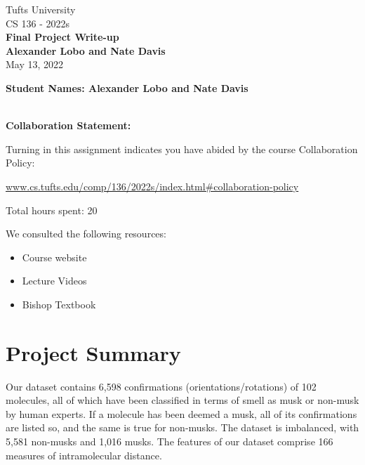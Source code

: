 \documentclass[11pt]{extarticle}
\begin{document}
\begin{titlepage}
\begin{center}
{\Large{Tufts University}}
~~\\[7.7 cm]
{\Huge {CS 136 - 2022s}} \\[0.4 cm]
{\Huge {\bf Final Project Write-up}} \\[7.7 cm]
{\Large {\bf Alexander Lobo and Nate Davis}}\\[0.4 cm]
{\Large{May 13, 2022}}
\end{center}
\end{titlepage}

\newpage

\begin{center}
{\Large{\bf Student Names: Alexander Lobo and Nate Davis}}
\end{center}

~~\\

{\Large{\bf Collaboration Statement:}}

Turning in this assignment indicates you have abided by the course Collaboration Policy:

\url{www.cs.tufts.edu/comp/136/2022s/index.html#collaboration-policy}

Total hours spent: 20

We consulted the following resources:
\begin{itemize}
\item Course website
\item Lecture Videos
\item Bishop Textbook
\end{itemize}

\tableofcontents

\newpage
\section{Project Summary}

Our dataset contains 6,598 confirmations (orientations/rotations) of 102 molecules, all of which have been classified in terms of smell as musk or non-musk by human experts. If a molecule has been deemed a musk, all of its confirmations are listed so, and the same is true for non-musks. The dataset is imbalanced, with 5,581 non-musks and 1,016 musks. The features of our dataset comprise 166 measures of intramolecular distance.
\end{document}
